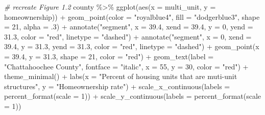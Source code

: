 \documentclass[
]{article}
\newenvironment{Shaded}{\begin{snugshade}}{\end{snugshade}}
\newcommand{\AttributeTok}[1]{\textcolor[rgb]{0.77,0.63,0.00}{#1}}
\newcommand{\CommentTok}[1]{\textcolor[rgb]{0.56,0.35,0.01}{\textit{#1}}}
\newcommand{\DecValTok}[1]{\textcolor[rgb]{0.00,0.00,0.81}{#1}}
\newcommand{\FloatTok}[1]{\textcolor[rgb]{0.00,0.00,0.81}{#1}}
\newcommand{\FunctionTok}[1]{\textcolor[rgb]{0.00,0.00,0.00}{#1}}
\newcommand{\NormalTok}[1]{#1}
\newcommand{\SpecialCharTok}[1]{\textcolor[rgb]{0.00,0.00,0.00}{#1}}
\newcommand{\StringTok}[1]{\textcolor[rgb]{0.31,0.60,0.02}{#1}}
\begin{document}
\begin{Shaded}
\begin{Highlighting}[]
\CommentTok{\# recreate Figure 1.2}
\NormalTok{county }\SpecialCharTok{\%\textgreater{}\%}
  \FunctionTok{ggplot}\NormalTok{(}\FunctionTok{aes}\NormalTok{(}\AttributeTok{x =}\NormalTok{ multi\_unit,}
             \AttributeTok{y =}\NormalTok{ homeownership)) }\SpecialCharTok{+}
  \FunctionTok{geom\_point}\NormalTok{(}\AttributeTok{color =} \StringTok{"royalblue4"}\NormalTok{,}
             \AttributeTok{fill =} \StringTok{"dodgerblue3"}\NormalTok{,}
             \AttributeTok{shape =} \DecValTok{21}\NormalTok{,}
             \AttributeTok{alpha =}\NormalTok{ .}\DecValTok{3}\NormalTok{) }\SpecialCharTok{+}
  \FunctionTok{annotate}\NormalTok{(}\StringTok{"segment"}\NormalTok{,}
           \AttributeTok{x =} \FloatTok{39.4}\NormalTok{, }\AttributeTok{xend =} \FloatTok{39.4}\NormalTok{,}
           \AttributeTok{y =} \DecValTok{0}\NormalTok{, }\AttributeTok{yend =} \FloatTok{31.3}\NormalTok{,}
           \AttributeTok{color =} \StringTok{"red"}\NormalTok{,}
           \AttributeTok{linetype =} \StringTok{"dashed"}\NormalTok{) }\SpecialCharTok{+}
  \FunctionTok{annotate}\NormalTok{(}\StringTok{"segment"}\NormalTok{,}
           \AttributeTok{x =} \DecValTok{0}\NormalTok{, }\AttributeTok{xend =} \FloatTok{39.4}\NormalTok{,}
           \AttributeTok{y =} \FloatTok{31.3}\NormalTok{, }\AttributeTok{yend =} \FloatTok{31.3}\NormalTok{,}
           \AttributeTok{color =} \StringTok{"red"}\NormalTok{,}
           \AttributeTok{linetype =} \StringTok{"dashed"}\NormalTok{) }\SpecialCharTok{+}
  \FunctionTok{geom\_point}\NormalTok{(}\AttributeTok{x =} \FloatTok{39.4}\NormalTok{, }\AttributeTok{y =} \FloatTok{31.3}\NormalTok{,}
             \AttributeTok{shape =} \DecValTok{21}\NormalTok{, }\AttributeTok{color =} \StringTok{"red"}\NormalTok{) }\SpecialCharTok{+}
  \FunctionTok{geom\_text}\NormalTok{(}\AttributeTok{label =} \StringTok{"Chattahoochee County"}\NormalTok{, }\AttributeTok{fontface =} \StringTok{"italic"}\NormalTok{,}
            \AttributeTok{x =} \DecValTok{55}\NormalTok{, }\AttributeTok{y =} \DecValTok{30}\NormalTok{, }\AttributeTok{color =} \StringTok{"red"}\NormalTok{) }\SpecialCharTok{+}
  \FunctionTok{theme\_minimal}\NormalTok{() }\SpecialCharTok{+}
  \FunctionTok{labs}\NormalTok{(}\AttributeTok{x =} \StringTok{"Percent of housing units that are muti{-}unit structures"}\NormalTok{,}
        \AttributeTok{y =} \StringTok{"Homeownership rate"}\NormalTok{) }\SpecialCharTok{+}
  \FunctionTok{scale\_x\_continuous}\NormalTok{(}\AttributeTok{labels =} \FunctionTok{percent\_format}\NormalTok{(}\AttributeTok{scale =} \DecValTok{1}\NormalTok{)) }\SpecialCharTok{+}
  \FunctionTok{scale\_y\_continuous}\NormalTok{(}\AttributeTok{labels =} \FunctionTok{percent\_format}\NormalTok{(}\AttributeTok{scale =} \DecValTok{1}\NormalTok{)) }
\end{Highlighting}
\end{Shaded}
\end{document}

